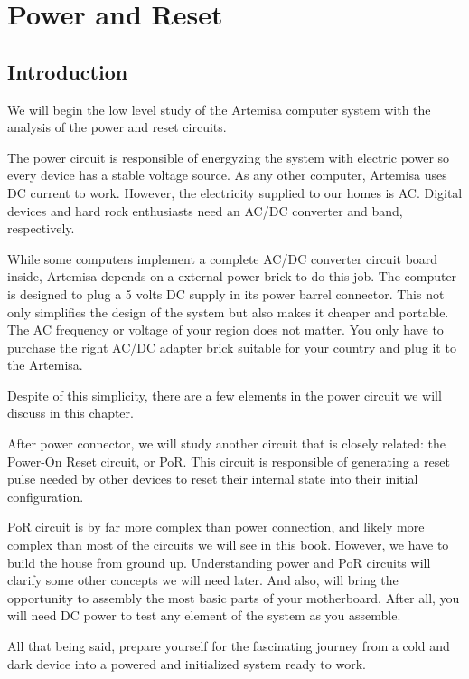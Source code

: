 \chapter{Power and Reset}

\section{Introduction}

We will begin the low level study of the Artemisa computer system with the analysis of the power and reset circuits.

The power circuit is responsible of energyzing the system with electric power so every device has a stable voltage source. As any other computer, Artemisa uses DC current to work. However, the electricity supplied to our homes is AC. Digital devices and hard rock enthusiasts need an AC/DC converter and band, respectively.

While some computers implement a complete AC/DC converter circuit board inside, Artemisa depends on a external power brick to do this job. The computer is designed to plug a 5 volts DC supply in its power barrel connector. This not only simplifies the design of the system but also makes it cheaper and portable. The AC frequency or voltage of your region does not matter. You only have to purchase the right AC/DC adapter brick suitable for your country and plug it to the Artemisa.

Despite of this simplicity, there are a few elements in the power circuit we will discuss in this chapter.

After power connector, we will study another circuit that is closely related: the Power-On Reset circuit, or PoR. This circuit is responsible of generating a reset pulse needed by other devices to reset their internal state into their initial configuration.

PoR circuit is by far more complex than power connection, and likely more complex than most of the circuits we will see in this book. However, we have to build the house from ground up. Understanding power and PoR circuits will clarify some other concepts we will need later. And also, will bring the opportunity to assembly the most basic parts of your motherboard. After all, you will need DC power to test any element of the system as you assemble.

All that being said, prepare yourself for the fascinating journey from a cold and dark device into a powered and initialized system ready to work.

